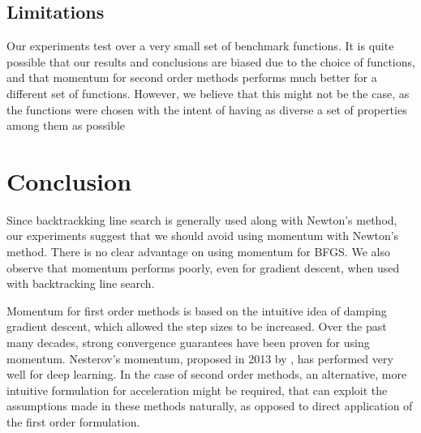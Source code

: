 \documentclass{article}
\begin{document}
\subsection{Limitations}
Our experiments test over a very small set of benchmark functions. It is quite possible that our results and conclusions are biased due to the choice of functions, and that momentum for second order methods performs much better for a different set of functions. However, we believe that this might not be the case, as the functions were chosen with the intent of having as diverse a set of properties among them as possible


\section{Conclusion}\label{conclusion}
Since backtrackking line search is generally used along with Newton's method, our experiments suggest that we should avoid using momentum with Newton's method. There is no clear advantage on using momentum for BFGS. We also observe that momentum performs poorly, even for gradient descent, when used with backtracking line search.

Momentum for first order methods is based on the intuitive idea of damping gradient descent, which allowed the step sizes to be increased. Over the past many decades, strong convergence guarantees have been proven for using momentum. Nesterov's momentum, proposed in 2013 by \citet{Sutskever}, has performed very well for deep learning. In the case of second order methods, an alternative, more intuitive formulation for acceleration might be required, that can exploit the assumptions made in these methods naturally, as opposed to direct application of the first order formulation.




\end{document}
